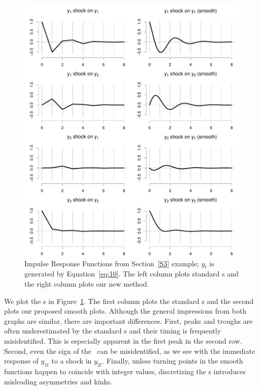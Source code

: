 \documentclass[12pt,fleqn]{article}
\begin{document}
\begin{figure}[t]
  \centering
  \includegraphics{graphs/numeric.pdf}
  \caption{Impulse Response Functions from Section~\ref{S3}
    example; $y_t$ is generated by Equation~\eqref{eq:10}. The left
    column plots standard \IRF s and the right column plots our new
    method.}
  \label{fig:3}
\end{figure}

We plot the \IRF s in Figure~\ref{fig:3}. The first column plots the
standard \IRF s and the second plots our proposed smooth
plots. Although the general impressions from both graphs are similar,
there are important differences. First, peaks and troughs are often
underestimated by the standard \IRF s and their timing is frequently
misidentified. This is especially apparent in the first peak in the
second row. Second, even the sign of the \IRF\ can be misidentified,
as we see with the immediate response of $y_{1t}$ to a shock in
$y_{2t}$. Finally, unless turning points in the smooth functions
happen to coincide with integer values, discretizing the \IRF s
introduces misleading asymmetries and kinks.
\end{document}
